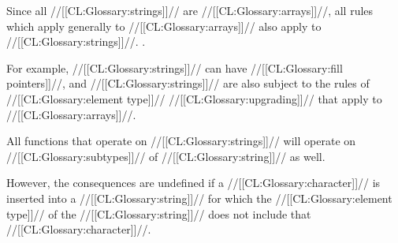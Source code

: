 


Since all //[[CL:Glossary:strings]]// are //[[CL:Glossary:arrays]]//, all rules which apply
generally to //[[CL:Glossary:arrays]]// also apply to //[[CL:Glossary:strings]]//.
\Seesection\ArrayConcepts.

For example,
     //[[CL:Glossary:strings]]// can have //[[CL:Glossary:fill pointers]]//,
 and //[[CL:Glossary:strings]]// are also subject to the rules of //[[CL:Glossary:element type]]// //[[CL:Glossary:upgrading]]//
        that apply to //[[CL:Glossary:arrays]]//.

\endsubsection%








All functions that operate on //[[CL:Glossary:strings]]// 
will operate on //[[CL:Glossary:subtypes]]// of //[[CL:Glossary:string]]// as well.

However,
the consequences are undefined if a //[[CL:Glossary:character]]// is inserted into a //[[CL:Glossary:string]]//
for which the //[[CL:Glossary:element type]]// of the //[[CL:Glossary:string]]// does not include that //[[CL:Glossary:character]]//.


\endsubsection%
